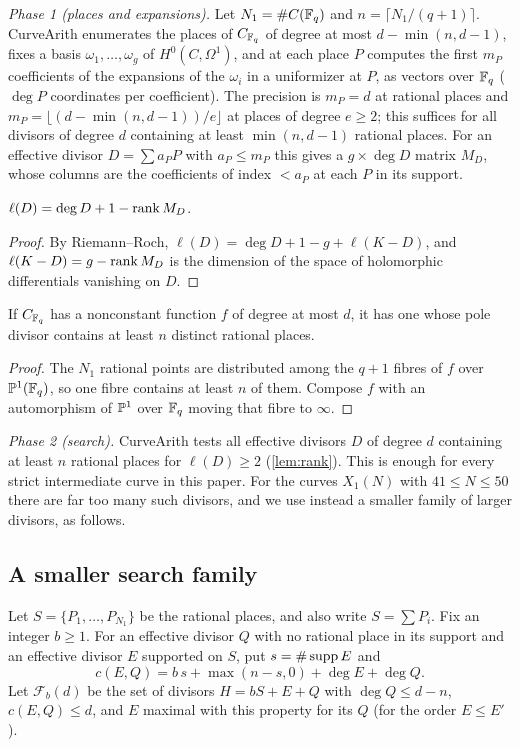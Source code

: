 \emph{Phase 1 (places and expansions).} Let $N_1=\#C(\mathbb{F}_q)$ and $n=\lceil N_1/(q+1)\rceil$. CurveArith
enumerates the places of $C_{\mathbb{F}_q}$ of degree at most $d-\min(n,d-1)$, fixes a basis $\omega_1,\dots,\omega_g$
of $H^0(C,\Omega^1)$, and at each place $P$ computes the first $m_P$ coefficients of the expansions of the
$\omega_i$ in a uniformizer at $P$, as vectors over $\mathbb{F}_q$ ($\deg P$ coordinates per coefficient). The precision is
$m_P=d$ at rational places and $m_P=\lfloor(d-\min(n,d-1))/e\rfloor$ at places of degree $e\ge2$; this suffices
for all divisors of degree $d$ containing at least $\min(n,d-1)$ rational places. For an
effective divisor $D=\sum a_PP$ with $a_P\le m_P$ this gives a $g\times\deg D$ matrix $M_D$, whose columns
are the coefficients of index $<a_P$ at each $P$ in its support.

\begin{lemma}\label{lem:rank}
$\ell(D)=\deg D+1-\operatorname{rank} M_D$.
\end{lemma}
\begin{proof}
By Riemann--Roch, $\ell(D)=\deg D+1-g+\ell(K-D)$, and $\ell(K-D)=g-\operatorname{rank} M_D$ is the dimension of the space of
holomorphic differentials vanishing on $D$.
\end{proof}

\begin{lemma}\label{lem:fibres}
If $C_{\mathbb{F}_q}$ has a nonconstant function $f$ of degree at most $d$, it has one whose pole divisor contains at
least $n$ distinct rational places.
\end{lemma}
\begin{proof}
The $N_1$ rational points are distributed among the $q+1$ fibres of $f$ over $\mathbb{P}^1(\mathbb{F}_q)$, so one fibre
contains at least $n$ of them. Compose $f$ with an automorphism of $\mathbb{P}^1$ over $\mathbb{F}_q$ moving that fibre to
$\infty$.
\end{proof}

\emph{Phase 2 (search).} CurveArith tests all effective divisors $D$ of degree $d$ containing at least $n$
rational places for $\ell(D)\ge2$ (\cref{lem:rank}). This is enough for every strict intermediate curve in
this paper. For the curves $X_1(N)$ with $41\le N\le50$ there are far too many such divisors, and we use
instead a smaller family of larger divisors, as follows.

\subsection{A smaller search family}\label{sec:phase2}
Let $S=\{P_1,\dots,P_{N_1}\}$ be the rational places, and also write $S=\sum P_i$. Fix an integer $b\ge1$.
For an effective divisor $Q$ with no rational place in its support and an effective divisor $E$ supported on
$S$, put $s=\#\operatorname{supp} E$ and
\begin{equation}\label{eq:budget}
 c(E,Q)=b\,s+\max(n-s,0)+\deg E+\deg Q.
\end{equation}
Let $\mathcal F_b(d)$ be the set of divisors $H=bS+E+Q$ with $\deg Q\le d-n$, $c(E,Q)\le d$, and $E$
maximal with this property for its $Q$ (for the order $E\le E'$).

